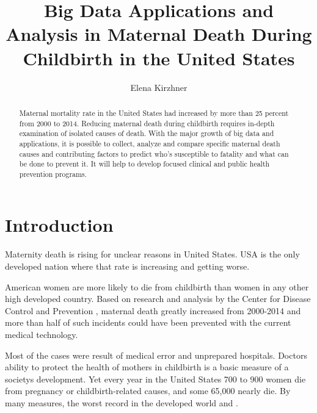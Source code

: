 \documentclass[sigconf]{acmart}
\begin{document}
\title{Big Data Applications and Analysis in Maternal Death During Childbirth in the United States}


\author{Elena Kirzhner}


\begin{abstract}

Maternal mortality rate in the United States had increased by more than 25 percent from 2000 to 2014. Reducing maternal death during childbirth requires in-depth examination of isolated causes of death. With the major growth of big data and applications, it is possible to collect, analyze and compare specific maternal death causes and contributing factors to predict who's susceptible to fatality and what can be done to prevent it. It will help to develop focused clinical and public health prevention programs.
\end{abstract}


\maketitle

\section{Introduction}

Maternity death is rising for unclear reasons in United States. USA is the only developed nation where that rate is increasing and getting worse.
 
American women are more likely to die from childbirth than women in any other high developed country. Based on research and analysis by the Center for Disease Control and Prevention \cite{bacak2006state}, maternal death greatly increased from 2000-2014 and more than half of such incidents could have been prevented with the current medical technology.

Most of the cases were result of medical error and unprepared hospitals. Doctor\textquotesingle s ability to protect the health of mothers in childbirth is a basic measure of a society\textquotesingle s development. Yet every year in the United States 700 to 900 women die from pregnancy or childbirth-related causes, and some 65,000 nearly die. By many measures, the worst record in the developed world \cite{world2012trends} and \cite{amnesty2010deadly}.
\end{document}
